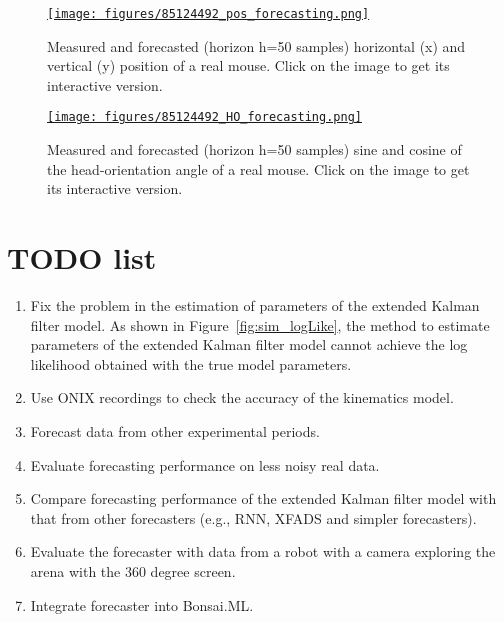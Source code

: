 \documentclass[12pt]{article}
\begin{document}
\begin{figure}
    \centering
    \href{https://www.gatsby.ucl.ac.uk/~rapela/aman/reports/ekfForKinematicsAndHeadOrientation/figures/85124492_pos_forecasting.html}{\texttt{[image: figures/85124492\_pos\_forecasting.png]}}
    \caption{Measured and forecasted (horizon h=50 samples) horizontal (x) and
    vertical (y) position of a real mouse. Click on the image to get its
    interactive version.}
    \label{fig:real_h50_pos}
\end{figure}

\begin{figure}
    \centering
    \href{https://www.gatsby.ucl.ac.uk/~rapela/aman/reports/ekfForKinematicsAndHeadOrientation/figures/85124492_HO_forecasting.html}{\texttt{[image: figures/85124492\_HO\_forecasting.png]}}
    \caption{Measured and forecasted (horizon h=50 samples) sine and cosine of
    the head-orientation angle of a real mouse. Click on the image to get
    its interactive version.}
    \label{fig:real_h50_HO}
\end{figure}

\section{TODO list}
\label{sec:TODO}

\begin{enumerate}

    \item Fix the problem in the estimation of parameters of the extended
        Kalman filter model. As shown in Figure~\ref{fig:sim_logLike}, the
        method to estimate parameters of the extended Kalman filter model
        cannot achieve the log likelihood obtained with the true model
        parameters.

    \item Use ONIX recordings to check the accuracy of the kinematics model.

    \item Forecast data from other experimental periods.

    \item Evaluate forecasting performance on less noisy real data.

    \item Compare forecasting performance of the extended Kalman filter model
        with that from other forecasters (e.g., RNN, XFADS and simpler
        forecasters).

    \item Evaluate the forecaster with data from a robot with a camera
        exploring the arena with the 360 degree screen.

    \item Integrate forecaster into Bonsai.ML.

\end{enumerate}
\end{document}
